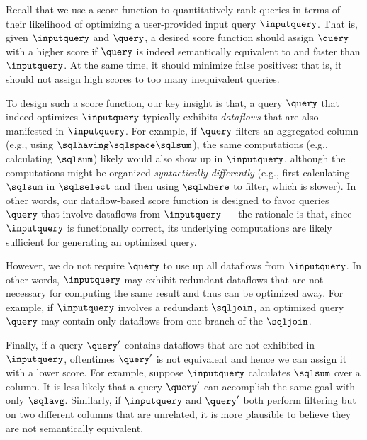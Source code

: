 Recall that we use a score function to quantitatively rank queries in terms of their likelihood of optimizing a user-provided input query $\inputquery$. That is, given $\inputquery$ and $\query$, a desired score function should assign $\query$ with a higher score if $\query$ is indeed semantically equivalent to and faster than $\inputquery$. At the same time, it should minimize false positives: that is, it should not assign high scores to too many inequivalent queries. 


To design such a score function, our key insight is that, a query $\query$ that indeed optimizes $\inputquery$ typically exhibits \emph{dataflows} that are also manifested in $\inputquery$. 
For example, if $\query$ filters an aggregated column (e.g., using $\sqlhaving \sqlspace \sqlsum$), the same computations (e.g., calculating $\sqlsum$) likely would also show up in $\inputquery$, although the computations might be organized \emph{syntactically differently} (e.g., first calculating $\sqlsum$ in $\sqlselect$ and then using $\sqlwhere$ to filter, which is slower). 
In other words, our dataflow-based score function is designed to favor queries $\query$ that involve dataflows from $\inputquery$ --- the rationale is that, since $\inputquery$ is functionally correct, its underlying computations are likely sufficient for generating an optimized query.


However, we do not require $\query$ to use up all dataflows from $\inputquery$. In other words, $\inputquery$ may exhibit redundant dataflows that are not necessary for computing the same result and thus can be optimized away. For example, if $\inputquery$ involves a redundant $\sqljoin$, an optimized query $\query$ may contain only dataflows from one branch of the $\sqljoin$. 


Finally, if a query $\query'$ contains dataflows that are not exhibited in $\inputquery$, oftentimes $\query'$ is not equivalent and hence we can assign it with a lower score. For example, suppose $\inputquery$ calculates $\sqlsum$ over a column. It is less likely that a query $\query'$ can accomplish the same goal with only $\sqlavg$. Similarly, if $\inputquery$ and $\query'$ both perform filtering but on two different columns that are unrelated, it is more plausible to believe they are not semantically equivalent. 



